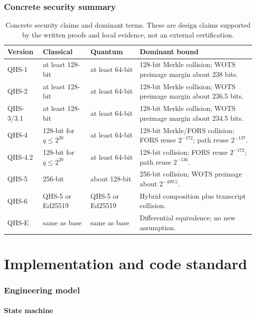 \documentclass[11pt,a4paper]{article}
\theoremstyle{remark}
\begin{document}
\section{Concrete security summary}

\begin{table}[ht]
\centering
\caption{Concrete security claims and dominant terms. These are design claims
supported by the written proofs and local evidence, not an external
certification.}
\label{tab:securitybounds}
\small
\begin{tabularx}{\textwidth}{@{}l l l X@{}}
\toprule
Version & Classical & Quantum & Dominant bound\\
\midrule
QHS-1 & at least 128-bit & at least 64-bit & 128-bit Merkle collision; WOTS preimage margin about 238 bits.\\
QHS-2 & at least 128-bit & at least 64-bit & 128-bit Merkle collision; WOTS preimage margin about 236.5 bits.\\
QHS-3/3.1 & at least 128-bit & at least 64-bit & 128-bit Merkle collision; WOTS preimage margin about 234.5 bits.\\
QHS-4 & 128-bit for \(q\le 2^{20}\) & at least 64-bit & 128-bit Merkle/FORS collision; FORS reuse \(2^{-172}\); path reuse \(2^{-137}\).\\
QHS-4.2 & 128-bit for \(q\le 2^{20}\) & at least 64-bit & 128-bit collision; FORS reuse \(2^{-172}\); path reuse \(2^{-136}\).\\
QHS-5 & 256-bit & about 128-bit & 256-bit collision; WOTS preimage about \(2^{-499.5}\).\\
QHS-6 & QHS-5 or Ed25519 & QHS-5 or Ed25519 & Hybrid composition plus transcript collision.\\
QHS-E & same as base & same as base & Differential equivalence; no new assumption.\\
\bottomrule
\end{tabularx}
\end{table}

\part{Implementation and code standard}

\section{Engineering model}

\subsection{State machine}
\end{document}
